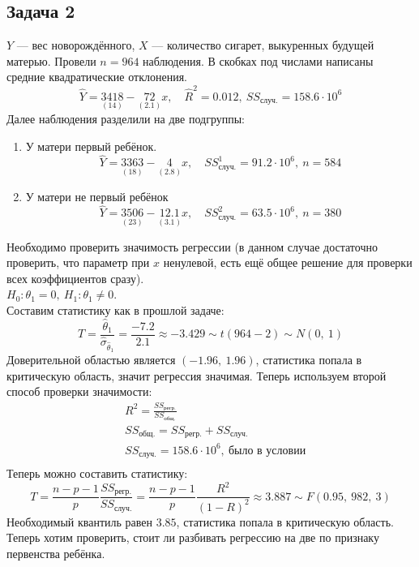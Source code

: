 \documentclass[12pt, a4paper]{article}
\begin{document}
\subsection*{Задача 2}
$Y$ --- вес новорождённого, $X$ --- количество сигарет, выкуренных будущей матерью. Провели $n = 964$ наблюдения. В скобках под числами написаны средние квадратические отклонения.
\[
\hat Y = \underset{(14)}{3418} - \underset{(2.1)}{72} x,\quad \hat R^2 = 0.012,\ SS_{\text{случ.}}  = 158.6 \cdot 10^6
\]
Далее наблюдения разделили на две подгруппы:
\begin{enumerate}
    \item У матери первый ребёнок.
    \[
    \hat Y = \underset{(18)}{3363} - \underset{(2.8)}{4} x,\quad SS^1_{\text{случ.}} = 91.2 \cdot 10^6,\ n = 584
    \]
    \item У матери не первый ребёнок
    \[
    \hat Y = \underset{(23)}{3506} - \underset{(3.1)}{12.1} x,\quad SS^2_{\text{случ.}} = 63.5 \cdot 10^6,\ n = 380
    \]
\end{enumerate}
Необходимо проверить значимость регрессии (в данном случае достаточно проверить, что параметр при $x$ ненулевой, есть ещё общее решение для проверки всех коэффициентов сразу).\\
$H_0: \theta_1 = 0,\ H_1: \theta_1 \neq 0$.\\
Составим статистику как в прошлой задаче:
\[
T = \frac{\hat \theta_1}{\hat \sigma_{\hat \theta_1}} = \frac{-7.2}{2.1} \approx -3.429 \sim t(964 - 2) \sim N(0,\ 1)
\]
Доверительной областью является $(-1.96,\ 1.96)$, статистика попала в критическую область, значит регрессия значимая.
Теперь используем второй способ проверки значимости:\\
\[
\begin{aligned}
    & R^2 = \frac{SS_{\text{регр.}}}{SS_{\text{общ.}}}\\
    & SS_{\text{общ.}} = SS_{\text{регр.}} + SS_{\text{случ.}}\\
    & SS_{\text{случ.}} = 158.6 \cdot 10^6,\ \text{было в условии}\\
\end{aligned}
\]
Теперь можно составить статистику:
\[
T = \frac{n - p - 1}{p} \frac{SS_{\text{регр.}}}{SS_{\text{случ.}}} = \frac{n - p - 1}{p} \frac{R^2}{(1 - R)^2} \approx 3.887 \sim F(0.95,\ 982,\ 3)
\]
Необходимый квантиль равен $3.85$, статистика попала в критическую область.\\
Теперь хотим проверить, стоит ли разбивать регрессию на две по признаку первенства ребёнка.\\
\end{document}
